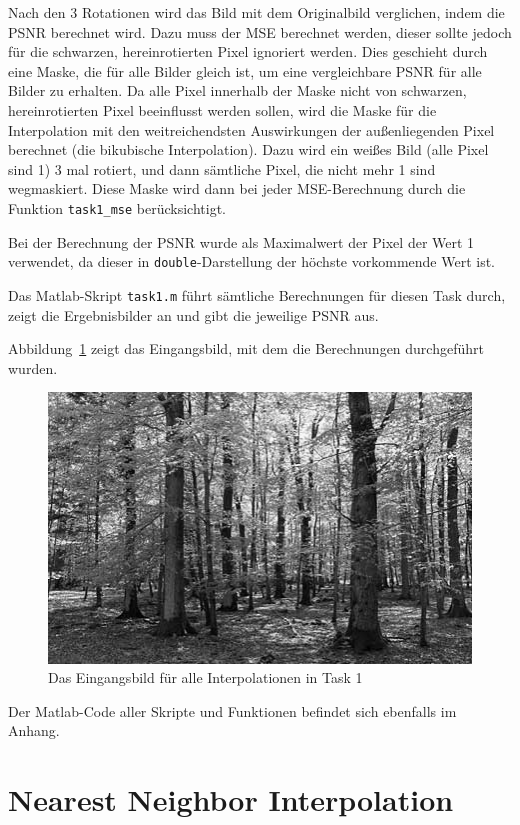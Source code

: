 Nach den 3 Rotationen wird das Bild mit dem Originalbild verglichen, indem die PSNR berechnet wird. Dazu muss der MSE berechnet werden, dieser sollte jedoch für die schwarzen, hereinrotierten Pixel ignoriert werden. Dies geschieht durch eine Maske, die für alle Bilder gleich ist, um eine vergleichbare PSNR für alle Bilder zu erhalten. Da alle Pixel innerhalb der Maske nicht von schwarzen, hereinrotierten Pixel beeinflusst werden sollen, wird die Maske für die Interpolation mit den weitreichendsten Auswirkungen der außenliegenden Pixel berechnet (die bikubische Interpolation). Dazu wird ein weißes Bild (alle Pixel sind 1) 3 mal rotiert, und dann sämtliche Pixel, die nicht mehr 1 sind wegmaskiert. Diese Maske wird dann bei jeder MSE-Berechnung durch die Funktion \texttt{task1\_mse} berücksichtigt.

Bei der Berechnung der PSNR wurde als Maximalwert der Pixel der Wert 1 verwendet, da dieser in \texttt{double}-Darstellung der höchste vorkommende Wert ist.

Das Matlab-Skript \texttt{task1.m} führt sämtliche Berechnungen für diesen Task durch, zeigt die Ergebnisbilder an und gibt die jeweilige PSNR aus.

Abbildung~\ref{fig:t1_original} zeigt das Eingangsbild, mit dem die Berechnungen durchgeführt wurden.

\begin{figure}[htb]
 \centering
 \includegraphics{./img/t1_original.png}
 \caption{Das Eingangsbild für alle Interpolationen in Task 1}
 \label{fig:t1_original}
\end{figure}

Der Matlab-Code aller Skripte und Funktionen befindet sich ebenfalls im Anhang.

\clearpage


\section{Nearest Neighbor Interpolation}


